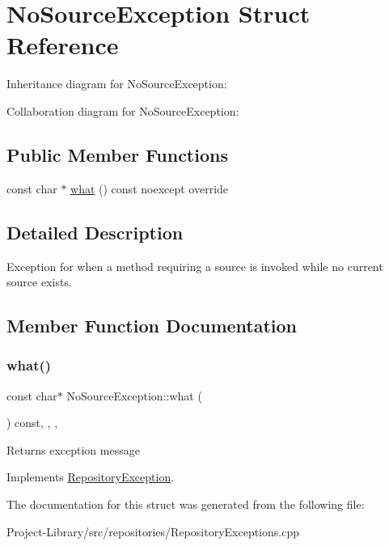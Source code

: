 \hypertarget{structNoSourceException}{}\section{No\+Source\+Exception Struct Reference}
\label{structNoSourceException}


Inheritance diagram for No\+Source\+Exception\+:


Collaboration diagram for No\+Source\+Exception\+:
\subsection*{Public Member Functions}
\begin{DoxyCompactItemize}
\item 
const char $\ast$ \hyperlink{structNoSourceException_a80ea47f101af8b9596b2af7cfe63da50}{what} () const noexcept override
\end{DoxyCompactItemize}


\subsection{Detailed Description}
Exception for when a method requiring a source is invoked while no current source exists. 

\subsection{Member Function Documentation}
\mbox{\label{structNoSourceException_a80ea47f101af8b9596b2af7cfe63da50}} 
\subsubsection{\texorpdfstring{what()}{what()}}
{\footnotesize\ttfamily const char$\ast$ No\+Source\+Exception\+::what (\begin{DoxyParamCaption}{ }\end{DoxyParamCaption}) const\hspace{0.3cm}{\ttfamily [inline]}, {\ttfamily [override]}, {\ttfamily [virtual]}, {\ttfamily [noexcept]}}

Returns exception message 

Implements \hyperlink{structRepositoryException_a6fdc5fe8fe6abdd205402d8648e5ccd4}{Repository\+Exception}.



The documentation for this struct was generated from the following file\+:\begin{DoxyCompactItemize}
\item 
Project-\/\+Library/src/repositories/Repository\+Exceptions.\+cpp\end{DoxyCompactItemize}
